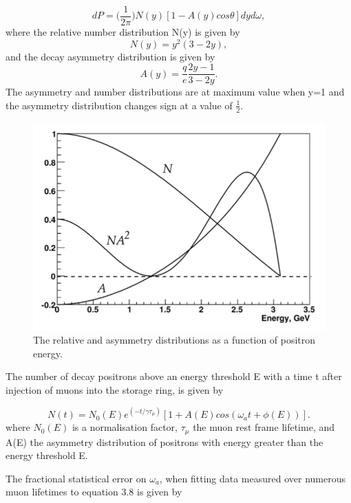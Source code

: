\begin{equation}
dP = \bigg(\frac{1}{2\pi}\bigg)N(y)[1-A(y)cos\theta]dyd\omega,
\end{equation}
\noindent
where the relative number distribution N(y) is given by
\begin{equation}
N(y)=y^2(3-2y),
\end{equation}
\noindent
and the decay asymmetry distribution is given by
\begin{equation}
A(y)=\frac{q}{e}\frac{2y-1}{3-2y}.
\end{equation}
\noindent
The asymmetry and number distributions are at maximum value when y=1 and the asymmetry distribution changes sign at a value of $\frac{1}{2}$.

\begin{figure}[th]
\centering
\includegraphics[scale=0.9]{Figures/NA2}
\decoRule
\caption{The relative and asymmetry distributions as a function of positron energy.}
\label{fig:NA2}
\end{figure}

The number of decay positrons above an energy threshold E with a time t after injection of muons into the storage ring, is given by

\begin{equation}
N(t)= N_0(E)e^{(-t/{\gamma}\tau_\mu)}[1+A(E)cos(\omega_{a}t+\phi(E))].
\end{equation}
\noindent
where $N_{0}(E)$ is a normalisation factor, $\tau_\mu$ the muon rest frame lifetime, and A(E) the asymmetry distribution of positrons with energy greater than the energy threshold E. 

The fractional statistical error on $\omega_{a}$, when fitting data measured over numerous muon lifetimes to equation 3.8 is given by

